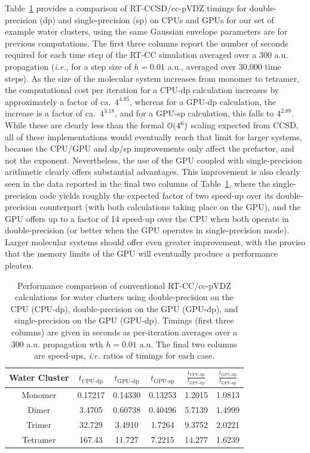 Table~\ref{tab:gpu-cpu} provides a comparison of RT-CCSD/cc-pVDZ timings for
double-precision (dp) and single-precision (sp) on CPUs and GPUs for our set of
example water clusters, using the same Gaussian envelope parameters are for
previous computations.  The first three columns report the number of seconds
required for each time step of the RT-CC simulation averaged over a 300 a.u.
propagation (\textit{i.e.}, for a step size of $h=0.01$ a.u., averaged over
30,000 time steps).  As the size of the molecular system increases from monomer
to tetramer, the computational cost per iteration for a CPU-dp calculation
increases by approximately a factor of ca.\ $4^{4.85}$, whereas for a GPU-dp
calculation, the increase is a factor of ca.\ $4^{3.18}$, and for a GPU-sp
calculation, this falls to $4^{2.88}$.  While these are clearly less than the
formal ${\cal O}(4^6)$ scaling expected from CCSD, all of these implementations
would eventually reach that limit for larger systems, because the CPU/GPU and
dp/sp improvements only affect the prefactor, and not the exponent.
Nevertheless, the use of the GPU coupled with single-precision arithmetic
clearly offers substantial advantages.  This improvement is also clearly seen in
the data reported in the final two columns of Table~\ref{tab:gpu-cpu}, where the
single-precision code yields roughly the expected factor of two speed-up over
its double-precision counterpart (with both calculations taking place on the
GPU), and the GPU offers up to a factor of 14 speed-up over the CPU when both
operate in double-precision (or better when the GPU operates in single-precision
mode).  Larger molecular systems should offer even greater improvement, with the
proviso that the memory limits of the GPU will eventually produce a performance
pleateu.
\begin{table} 
    \centering
        \caption{Performance comparison of conventional RT-CC/cc-pVDZ calculations
for water clusters using double-precision on the CPU (CPU-dp), double-precision
on the GPU (GPU-dp), and single-precision on the GPU (GPU-dp). Timings (first
three columns) are given in seconds as per-iteration averages over a 300 a.u.
propagation wth $h=0.01$ a.u.  The final two columns are speed-ups,
\textit{i.e.} ratios of timings for each case.}
    \begin{tabular}{c|ccccc}
       \textrm{Water Cluster} & $t_\textrm{CPU-dp}$ &  $t_\textrm{GPU-dp}$ &
$t_\textrm{GPU-sp}$ & $\frac{t_\textrm{CPU-dp}}{t_\textrm{GPU-dp}}$ &
$\frac{t_\textrm{GPU-dp}}{t_\textrm{GPU-sp}}$\\ \hline
       \textrm{Monomer} & 0.17217 & 0.14330 & 0.13253 & 1.2015 & 1.0813\\ 
       \textrm{Dimer} & 3.4705 & 0.60738 & 0.40496 & 5.7139 & 1.4999\\
       \textrm{Trimer} & 32.729 & 3.4910 & 1.7264 & 9.3752 & 2.0221 \\
       \textrm{Tetramer} & 167.43 & 11.727 & 7.2215 & 14.277 & 1.6239\\     
    \end{tabular}
    \label{tab:gpu-cpu}
\end{table}
        
